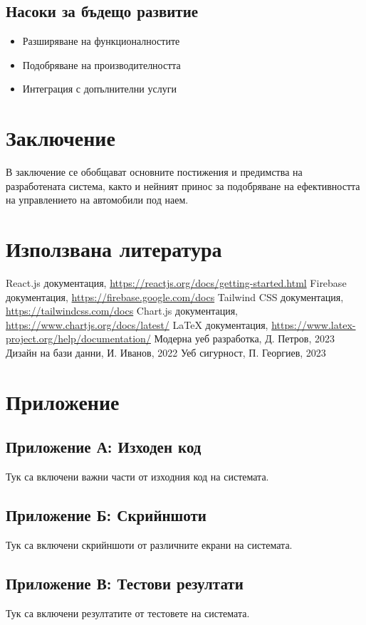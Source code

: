 \documentclass[12pt,a4paper]{article}
\begin{document}
\subsection{Насоки за бъдещо развитие}
\begin{itemize}
    \item Разширяване на функционалностите
    \item Подобряване на производителността
    \item Интеграция с допълнителни услуги
\end{itemize}

\section{Заключение}
В заключение се обобщават основните постижения и предимства на разработената система, както и нейният принос за подобряване на ефективността на управлението на автомобили под наем.

\section{Използвана литература}
\begin{thebibliography}{9}
 React.js документация, \url{https://reactjs.org/docs/getting-started.html}
 Firebase документация, \url{https://firebase.google.com/docs}
 Tailwind CSS документация, \url{https://tailwindcss.com/docs}
 Chart.js документация, \url{https://www.chartjs.org/docs/latest/}
 LaTeX документация, \url{https://www.latex-project.org/help/documentation/}
 Модерна уеб разработка, Д. Петров, 2023
 Дизайн на бази данни, И. Иванов, 2022
 Уеб сигурност, П. Георгиев, 2023
\end{thebibliography}

\section{Приложение}
\subsection{Приложение А: Изходен код}
Тук са включени важни части от изходния код на системата.

\subsection{Приложение Б: Скрийншоти}
Тук са включени скрийншоти от различните екрани на системата.

\subsection{Приложение В: Тестови резултати}
Тук са включени резултатите от тестовете на системата.
\end{document}
